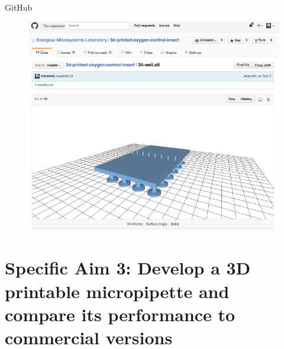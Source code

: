 \documentclass{beamer}
\begin{document}
\begin{frame}{GitHub}
\begin{figure}
\includegraphics[width=0.8\linewidth]{images/github-insert.png}
\end{figure}
\end{frame}

\section{Specific Aim 3: Develop a 3D printable micropipette and compare its performance to commercial versions}
\end{document}
